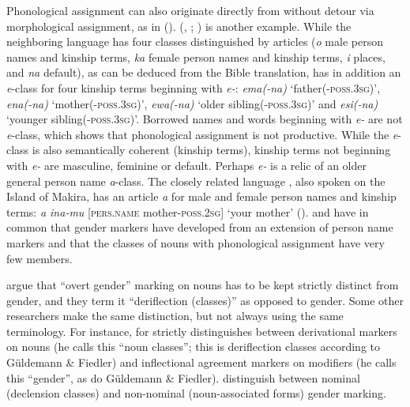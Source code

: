 \documentclass[output=collectionpaper]{langsci/langscibook}
\begin{document}
Phonological assignment can also originate directly from  without detour via morphological assignment, as in  (\citealt{Waelchli2018}).  (, ; \citealt[26]{Mellow2013}) is another example. While the neighboring language  has four classes distinguished by articles (\textit{o} male person names and kinship terms, \textit{ka} female person names and kinship terms, \textit{i} places, and \textit{na} default), as can be deduced from the  Bible translation,  has in addition an \textit{e}-class for four kinship terms beginning with \textit{e-}: \textit{ema(-na)} `father(\mbox{\textsc{-poss.3sg}})', \textit{ena(-na)} `mother(\textsc{-poss.3sg})', \textit{ewa(-na)
} `older sibling(\textsc{-poss.3sg})' and \textit{esi(-na)} `younger sibling(\textsc{-poss.3sg})'. Borrowed names and words beginning with \textit{e-} are not \textit{e}-class, which shows that phonological assignment is not productive. While the \textit{e}-class is also semantically coherent (kinship terms), kinship terms not beginning with \textit{e-} are masculine, feminine or default. Perhaps \textit{e-} is a relic of an older general person name \textit{a}-class. The closely related language , also spoken on the Island of Makira, has an article \textit{a} for male and female person names and kinship terms: \textit{a ina-mu} [\textsc{pers.name} mother\textsc{-poss.2sg}] `your mother' (\citealt[14, 40]{Capell1971}).  and  have in common that gender markers have developed from an extension of person name markers and that the classes of nouns with phonological assignment have very few members.

 argue that ``overt gender'' marking on nouns has to be kept strictly distinct from gender, and they term it ``deriflection (classes)'' as opposed to gender. Some other researchers make the same distinction, but not always using the same terminology. For instance, \cite[181--221]{Evans2003} for  strictly distinguishes between derivational markers on nouns (he calls this ``noun classes''; this is deriflection classes according to Güldemann \& Fiedler) and inflectional agreement markers on modifiers (he calls this ``gender'', as do Güldemann \& Fiedler). \cite{DiGarbo2018} distinguish between nominal (declension classes) and non-nominal (noun-associated forms) gender marking.
\end{document}

